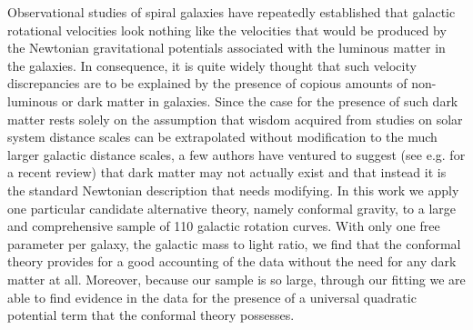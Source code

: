 \documentclass[preprint,aps]{revtex4}
\begin{document}
Observational studies of spiral galaxies have repeatedly established that galactic rotational velocities look nothing like the velocities that would be produced by the Newtonian gravitational potentials associated with the luminous matter in the galaxies. In consequence, it is quite widely thought that such velocity discrepancies are to be explained by the presence of copious amounts of non-luminous or dark matter in galaxies. Since the case for the presence of such dark matter rests solely on the assumption that wisdom acquired from studies on solar system distance scales can be extrapolated without modification to the much larger galactic distance scales, a few authors have ventured to suggest (see e.g. \cite{Mannheim2006} for a recent review) that dark matter may not actually exist and that instead it is the standard Newtonian description that needs modifying. In this work we apply one particular candidate alternative theory, namely conformal gravity, to a large and comprehensive sample of 110 galactic rotation curves. With only one free parameter per galaxy, the galactic mass to light ratio, we find that the conformal theory provides for a good accounting of the data without the need for any dark matter at all. Moreover, because our sample is so large, through our fitting we are able to find evidence in the data for the presence of a universal quadratic potential term that the conformal theory possesses.
\end{document}

